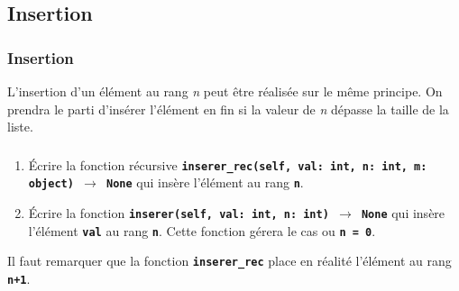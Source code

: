 \documentclass[svgnames,11pt]{beamer}
\begin{document}
\subsection{Insertion}
\begin{frame}
    \frametitle{Insertion}

L'insertion d'un élément au rang \emph{n} peut être réalisée sur le même principe. On prendra le parti d'insérer l'élément en fin si la valeur de \emph{n} dépasse la taille de la liste.


    \begin{center}
    \end{center}
    \begin{center}
    \end{center}
\end{frame}
\begin{frame}
    \frametitle{}

\begin{activite}
\begin{enumerate}
    \item Écrire la fonction récursive \textbf{\texttt{inserer\_rec(self, val: int, n: int, m: object) $\rightarrow$ None}} qui insère l'élément au rang \textbf{\texttt{n}}.
    \item Écrire la fonction \textbf{\texttt{inserer(self, val: int, n: int) $\rightarrow$ None}} qui insère l'élément \textbf{\texttt{val}} au rang \textbf{\texttt{n}}. Cette fonction gérera le cas ou \textbf{\texttt{n = 0}}.
\end{enumerate}
\end{activite}
\begin{aretenir}[Remarque]
Il faut remarquer que la fonction \textbf{\texttt{inserer\_rec}} place en réalité l'élément au rang \textbf{\texttt{n+1}}.
\end{aretenir}
\end{frame}
\end{document}
